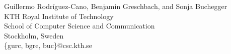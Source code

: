\begin{center}
Guillermo Rodr\'{i}guez-Cano, Benjamin Greschbach, and Sonja Buchegger\\[2em]

KTH Royal Institute of Technology\\
School of Computer Science and Communication\\
Stockholm, Sweden\\
\{gurc, bgre, buc\}@csc.kth.se
\end{center}





